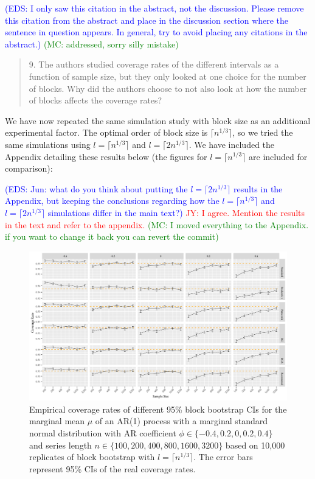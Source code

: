 \documentclass[12pt]{article}
\newcommand{\jy}[1]{\textcolor{red}{JY: #1}}
\newcommand{\eds}[1]{\textcolor{blue}{(EDS: #1)}}
\newcommand{\mc}[1]{\textcolor{green}{(MC: #1)}}
\newenvironment{comment}%
{\begin{quotation}\noindent\small\it\color{darkblue}\ignorespaces%
}{\end{quotation}}
\begin{document}
\eds{I only saw this citation in the abstract, not the discussion.  
Please remove this citation from the abstract and place in the discussion 
section where the sentence in question appears. In general,
try to avoid placing any citations in the abstract.}
\mc{addressed, sorry silly mistake}

\begin{comment}
9.   The authors studied coverage rates of the different intervals as a function 
of sample size, but they only looked at one choice for the number of blocks.  
Why did the authors choose to not also look at how the number of blocks affects 
the coverage rates?
\end{comment}

We have now repeated the same simulation study with block size as an 
additional experimental factor. The optimal order of block size is 
$\lceil n^{1/3} \rceil$, so we tried the same simulations using 
$l = \lceil n^{1/3} \rceil$ and $l = \lceil 2n^{1/3} \rceil$. We have included
the Appendix detailing these results below (the 
figures for 
$l = \lceil n^{1/3} \rceil$ are included for comparison):

\eds{\@ Jun: what do you think about putting the $l = \lceil 2n^{1/3} \rceil$
results in the Appendix, but keeping the conclusions regarding how the 
$l = \lceil n^{1/3} \rceil$ and $l = \lceil 2n^{1/3} \rceil$ simulations differ
in the main text?} \jy{I agree. Mention the results in the text and
refer to the appendix.}
\mc{I moved everything to the Appendix. if you want to change it back you can 
revert the commit}

\begin{figure}[tbp]
  \centering
  \includegraphics[width=\textwidth]{figures/plot_norm_mu_1}
  \caption{Empirical coverage rates of different 95\% block bootstrap CIs for
    the marginal mean $\mu$ of an AR(1) process with a marginal standard 
    normal distribution with AR coefficient
    $\phi \in \{-0.4, 0.2, 0, 0.2, 0.4\}$ and series length
    $n \in \{100, 200, 400, 800, 1600, 3200\}$ based on 10,000 replicates of
    block bootstrap with $l = \lceil n^{1/3} \rceil$. The
    error bars represent 95\% CIs of the real coverage rates.}
  \label{fig:mu1}
\end{figure}
\end{document}
